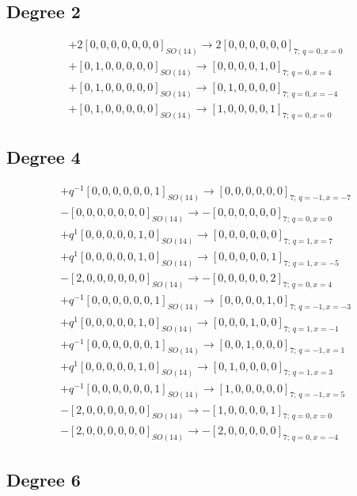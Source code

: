\documentclass{article}
\begin{document}
\subsection*{Degree 2}
\[\begin{gathered} +2[0,0,0,0,0,0,0]_{SO(14)}\longrightarrow 2[0,0,0,0,0,0]_{7;\,q=0,x=0}\\+[0,1,0,0,0,0,0]_{SO(14)}\longrightarrow [0,0,0,0,1,0]_{7;\,q=0,x=4}\\+[0,1,0,0,0,0,0]_{SO(14)}\longrightarrow [0,1,0,0,0,0]_{7;\,q=0,x=-4}\\+[0,1,0,0,0,0,0]_{SO(14)}\longrightarrow [1,0,0,0,0,1]_{7;\,q=0,x=0}\end{gathered}\]\subsection*{Degree 4}
\[\begin{gathered} +q^{-1}[0,0,0,0,0,0,1]_{SO(14)}\longrightarrow [0,0,0,0,0,0]_{7;\,q=-1,x=-7}\\-[0,0,0,0,0,0,0]_{SO(14)}\longrightarrow -[0,0,0,0,0,0]_{7;\,q=0,x=0}\\+q^{1}[0,0,0,0,0,1,0]_{SO(14)}\longrightarrow [0,0,0,0,0,0]_{7;\,q=1,x=7}\\+q^{1}[0,0,0,0,0,1,0]_{SO(14)}\longrightarrow [0,0,0,0,0,1]_{7;\,q=1,x=-5}\\-[2,0,0,0,0,0,0]_{SO(14)}\longrightarrow -[0,0,0,0,0,2]_{7;\,q=0,x=4}\\+q^{-1}[0,0,0,0,0,0,1]_{SO(14)}\longrightarrow [0,0,0,0,1,0]_{7;\,q=-1,x=-3}\\+q^{1}[0,0,0,0,0,1,0]_{SO(14)}\longrightarrow [0,0,0,1,0,0]_{7;\,q=1,x=-1}\\+q^{-1}[0,0,0,0,0,0,1]_{SO(14)}\longrightarrow [0,0,1,0,0,0]_{7;\,q=-1,x=1}\\+q^{1}[0,0,0,0,0,1,0]_{SO(14)}\longrightarrow [0,1,0,0,0,0]_{7;\,q=1,x=3}\\+q^{-1}[0,0,0,0,0,0,1]_{SO(14)}\longrightarrow [1,0,0,0,0,0]_{7;\,q=-1,x=5}\\-[2,0,0,0,0,0,0]_{SO(14)}\longrightarrow -[1,0,0,0,0,1]_{7;\,q=0,x=0}\\-[2,0,0,0,0,0,0]_{SO(14)}\longrightarrow -[2,0,0,0,0,0]_{7;\,q=0,x=-4}\end{gathered}\]\subsection*{Degree 6}
\end{document}
